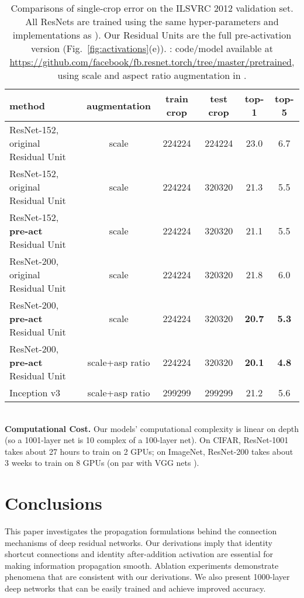 \documentclass[runningheads]{llncs}
\begin{document}
\renewcommand\arraystretch{1.2}
\setlength{\tabcolsep}{3pt}
\begin{table}[t]
\caption{Comparisons of single-crop error on the ILSVRC 2012 validation set. All ResNets are trained using the same hyper-parameters and implementations as \cite{He2016}). Our Residual Units are the full pre-activation version (Fig.~\ref{fig:activations}(e)). : code/model available at \url{https://github.com/facebook/fb.resnet.torch/tree/master/pretrained}, using scale and aspect ratio augmentation in \cite{Szegedy2015}.
}\label{tab:imagenet}
\centering
\fontsize{8pt}{1em}\selectfont
\begin{tabular}{l|c|c|c|c|c}
\hline
 \tiny method & \tiny augmentation & \tiny train crop & \tiny test crop & \tiny top-1 & \tiny top-5 \\
\hline
ResNet-152, original Residual Unit \cite{He2016} & scale & 224224 & 224224 & 23.0  & 6.7 \\
\hline
ResNet-152, original Residual Unit \cite{He2016} & scale & 224224 & 320320 & 21.3  & 5.5 \\
ResNet-152, \textbf{pre-act} Residual Unit & scale & 224224 & 320320 & 21.1 & 5.5 \\
\hline
ResNet-200, original Residual Unit \cite{He2016} & scale & 224224 & 320320 & 21.8 & 6.0 \\
ResNet-200, \textbf{pre-act} Residual Unit & scale & 224224 & 320320 & \textbf{20.7} & \textbf{5.3} \\
ResNet-200, \textbf{pre-act} Residual Unit & scale+asp ratio & 224224 & 320320 & \textbf{20.1} & \textbf{4.8} \\
\hline
Inception v3 \cite{Szegedy2016a} & scale+asp ratio & 299299 & 299299 & 21.2 & 5.6 \\
\hline
\end{tabular}
\end{table}

{\small ~\\}
\noindent\textbf{Computational Cost.}
Our models' computational complexity is linear on depth (so a 1001-layer net is 10 complex of a 100-layer net). On CIFAR, ResNet-1001 takes about 27 hours to train on 2 GPUs; on ImageNet, ResNet-200 takes about 3 weeks to train on 8 GPUs (on par with VGG nets \cite{Simonyan2015}).


\section{Conclusions}

This paper investigates the propagation formulations behind the connection mechanisms of deep residual networks. Our derivations imply that identity shortcut connections and identity after-addition activation are essential for making information propagation smooth. Ablation experiments demonstrate phenomena that are consistent with our derivations. We also present 1000-layer deep networks that can be easily trained and achieve improved accuracy.
\end{document}
